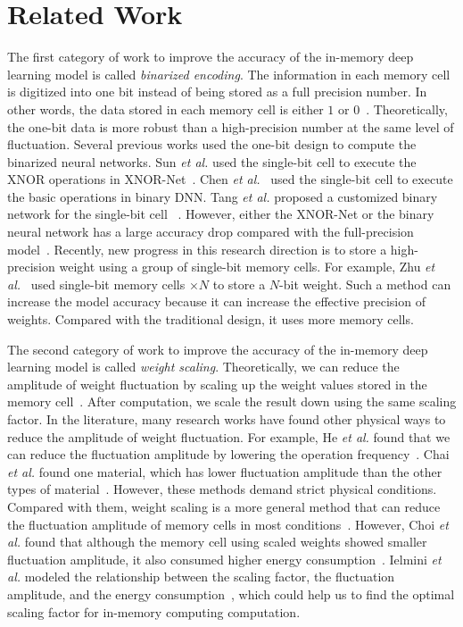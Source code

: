\documentclass[10pt,journal,compsoc]{IEEEtran}
\begin{document}
\section{Related Work}
\label{s2}

The first category of work to improve the accuracy of the in-memory deep learning model is called \textit{binarized encoding}. The information in each memory cell is digitized into one bit instead of being stored as a full precision number. In other words, the data stored in each memory cell is either $1$ or $0$~\cite{emara2014differential}. Theoretically, the one-bit data is more robust than a high-precision number at the same level of fluctuation.  Several previous works used the one-bit design to compute the binarized neural networks. Sun \textit{et al.} used the single-bit cell to execute the XNOR operations in XNOR-Net~\cite{sun2018xnor}. Chen \textit{et al.}~\cite{chen201865nm} used the single-bit cell to execute the basic operations in binary DNN. Tang \textit{et al.} proposed a customized binary network for the single-bit cell ~\cite{tang2017binary}. However, either the XNOR-Net or the binary neural network has a large accuracy drop compared with the full-precision model~\cite{rastegari2016xnor}. Recently, new progress in this research direction is to store a high-precision weight using a group of single-bit memory cells. For example, Zhu \textit{et al.}~\cite{zhu2019configurable} used single-bit memory cells $\times N$ to store a $N$-bit weight. Such a method can increase the model accuracy because it can increase the effective precision of weights. Compared with the traditional design, it uses more memory cells.

The second category of work to improve the accuracy of the in-memory deep learning model is called \textit{weight scaling}. Theoretically, we can reduce the amplitude of weight fluctuation by scaling up the weight values stored in the memory cell~\cite{peng2019optimizing}. After computation, we scale the result down using the same scaling factor. In the literature, many research works have found other physical ways to reduce the amplitude of weight fluctuation. For example, He \textit{et al.} found that we can reduce the fluctuation amplitude by lowering the operation frequency~\cite{he2019noise}. Chai \textit{et al.} found one material, which has lower fluctuation amplitude than the other types of material~\cite{chai2018impact}. However, these methods demand strict physical conditions. Compared with them, weight scaling is a more general method that can reduce the fluctuation amplitude of memory cells in most conditions~\cite{sorbaro2020optimizing}. However, Choi \textit{et al.} found that although the memory cell using scaled weights showed smaller fluctuation amplitude, it also consumed higher energy consumption~\cite{choi2014random}. Ielmini \textit{et al.} modeled the relationship between the scaling factor, the fluctuation amplitude, and the energy consumption~\cite{ielmini2010resistance}, which could help us to find the optimal scaling factor for in-memory computing computation.
\end{document}
